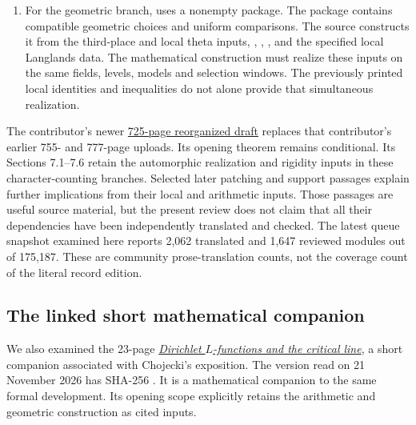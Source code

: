 \begin{enumerate}
\item For the geometric branch,
\href{https://github.com/ChristianKudeba/alpoge-rh-verification/blob/alpoge-source-7cbf7a0c/src/Development/AutomorphicArithmetic/ThetaCorrespondence/ThetaPairLifts/ThirdPlaceSeries/TopPlug.lean}{}
uses a nonempty  package.
The package contains compatible geometric choices and uniform
comparisons.
The source
\href{https://github.com/ChristianKudeba/alpoge-rh-verification/blob/alpoge-source-7cbf7a0c/src/Development/AutomorphicArithmetic/ThetaCorrespondence/ThetaPairLifts/ThirdPlaceSeries/SiegelEisensteinSecondTermHypotheses.lean}{}
constructs it from the third-place and local theta inputs,
, ,
, and the specified local Langlands data.
The mathematical construction must realize these inputs on the
same fields, levels, models and selection windows.
The previously printed local identities and inequalities do not
alone provide that simultaneous realization.
\end{enumerate}

The contributor's newer
\href{https://principia-math.com/api/ws/files/1ef7d144fa8b6175858552f76ae0c0d5}{725-page reorganized draft}
replaces that contributor's earlier 755- and 777-page uploads.
Its opening theorem remains conditional.
Its Sections 7.1--7.6 retain the automorphic realization and rigidity
inputs in these character-counting branches.
Selected later patching and support passages explain further
implications from their local and arithmetic inputs.
Those passages are useful source material, but the present review
does not claim that all their dependencies have been independently
translated and checked.
The latest queue snapshot examined here reports 2,062 translated
and 1,647 reviewed modules out of 175,187.
These are community prose-translation counts, not the coverage
count of the literal record edition.

\subsection{The linked short mathematical companion}
\label{subsec:sr-chojecki-review}
We also examined the 23-page
\href{https://www.ulam.ai/research/rh-short.pdf}
{\emph{Dirichlet \(L\)-functions and the critical line}},
a short companion associated with Chojecki's exposition.
The version read on 21 November 2026 has SHA-256
.
It is a mathematical companion to the same formal development.
Its opening scope explicitly retains the arithmetic and geometric
construction as cited inputs.

